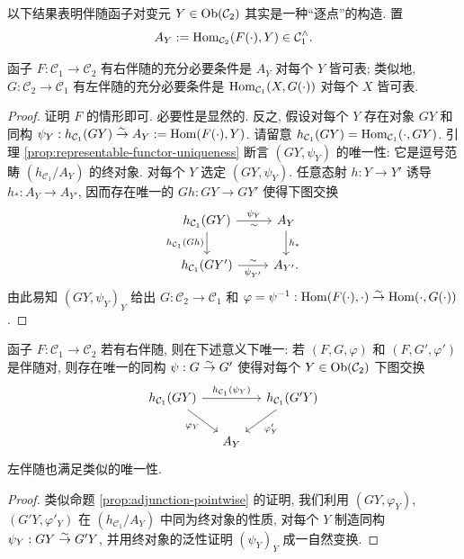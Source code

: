 以下结果表明伴随函子对变元 $Y \in \operatorname{Ob}(\mathcal{C}_2)$ 其实是一种``逐点''的构造. 置
\[ A_Y := \operatorname{Hom}_{\mathcal{C}_2}(F(\cdot), Y) \in \mathcal{C}_1^\wedge. \]

\begin{proposition}\label{prop:adjunction-pointwise}
	函子 $F: \mathcal{C}_1 \to \mathcal{C}_2$ 有右伴随的充分必要条件是 $A_Y$ 对每个 $Y$ 皆可表; 类似地, $G: \mathcal{C}_2 \to \mathcal{C}_1$ 有左伴随的充分必要条件是 $\operatorname{Hom}_{\mathcal{C}_1}(X, G(\cdot))$ 对每个 $X$ 皆可表.
\end{proposition}
\begin{proof}
	证明 $F$ 的情形即可. 必要性是显然的. 反之, 假设对每个 $Y$ 存在对象 $GY$ 和同构 $\psi_Y: h_{\mathcal{C}_1}(GY) \stackrel{\sim}{\rightarrow} A_Y := \operatorname{Hom}(F(\cdot), Y)$. 请留意 $h_{\mathcal{C}_1}(GY) = \operatorname{Hom}_{\mathcal{C}_1}(\cdot, GY)$. 引理 \ref{prop:representable-functor-uniqueness} 断言 $(GY, \psi_Y)$ 的唯一性: 它是逗号范畴 $(h_{\mathcal{C}_1} / A_Y)$ 的终对象. 对每个 $Y$ 选定 $(GY, \psi_Y)$. 任意态射 $h: Y \to Y'$ 诱导 $h_*: A_Y \to A_{Y'}$, 因而存在唯一的 $Gh: GY \to GY'$ 使得下图交换
	\[ \begin{tikzcd}
		h_{\mathcal{C}_1}(GY) \arrow[d, "{h_{\mathcal{C}_1}(Gh)}"'] \arrow[r, "\psi_Y", "\sim"'] & A_Y \arrow[d, "h_*"] \\
		h_{\mathcal{C}_1}(GY') \arrow[r, "{\psi_{Y'}}"', "\sim"] & A_{Y'} .
	\end{tikzcd} \]
	由此易知 $(GY, \psi_Y)_Y$ 给出 $G: \mathcal{C}_2 \to \mathcal{C}_1$ 和 $\varphi = \psi^{-1}: \operatorname{Hom}(F(\cdot), \cdot) \stackrel{\sim}{\rightarrow} \operatorname{Hom}(\cdot, G(\cdot))$.
\end{proof}

\begin{proposition}\label{prop:adjunction-uniqueness}
	函子 $F: \mathcal{C}_1 \to \mathcal{C}_2$ 若有右伴随, 则在下述意义下唯一: 若 $(F, G, \varphi)$ 和 $(F, G', \varphi')$ 是伴随对, 则存在唯一的同构 $\psi: G \stackrel{\sim}{\rightarrow} G'$ 使得对每个 $Y \in \operatorname{Ob}(\mathcal{C}_2)$ 下图交换
	\[ \begin{tikzcd}[column sep=small]
		h_{\mathcal{C}_1}(GY) \arrow[rr, "{h_{\mathcal{C}_1}(\psi_Y)}"] \arrow[rd, "\varphi_Y"'] & & h_{\mathcal{C}_1}(G'Y) \arrow[ld, "{{\varphi}'_Y}"] \\
		& A_Y &
	\end{tikzcd} \]
	左伴随也满足类似的唯一性.
\end{proposition}
\begin{proof}
	类似命题 \ref{prop:adjunction-pointwise} 的证明, 我们利用 $(GY, \varphi_Y)$, $(G'Y, {\varphi}'_Y)$ 在 $(h_{\mathcal{C}_1} / A_Y)$ 中同为终对象的性质, 对每个 $Y$ 制造同构 $\psi_Y: GY \stackrel{\sim}{\rightarrow} G'Y$, 并用终对象的泛性证明 $(\psi_Y)_Y$ 成一自然变换.
\end{proof}


